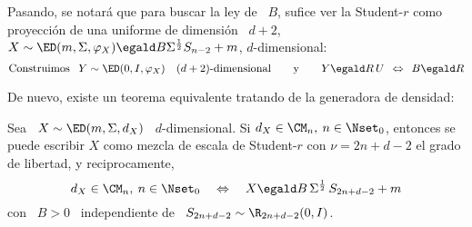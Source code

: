 Pasando, se notar\'a que para buscar la  ley de \ $B$, sufice ver la Student-$r$
como  proyecci\'on  de una  uniforme  de  dimensi\'on \  $d+2$,  \ie  \ $X  \sim
\ED(m,\Sigma,\varphi_X) \egald B \Sigma^{\frac12} S_{n-2} + m$, $d$-dimensional:
%
\[
\mbox{Construimos     }     \:\:     Y     \sim     \ED(0,I,\varphi_X)     \quad
(d+2)\mbox{-dimensional}  \qquad   \mbox{y}  \qquad  Y   \egald  R  \,   U  \:\:
\Leftrightarrow \:\: B \egald R
\]


De nuevo, existe un teorema equivalente tratando de la generadora de densidad:
%
\begin{teorema}
\label{Teo:MP:MezclaStudentRDensidad}
%
  Sea \  $X \sim \ED(m,\Sigma,d_X)$ \  $d$-dimensional. Si $d_X \in  \CM_n, \: n
  \in  \Nset_0$,  entonces  se puede  escribir  $X$  como  mezcla de  escala  de
  Student-$r$ con $\nu = 2 n + d - 2$ el grado de libertad, y reciprocamente,
  \[
  d_X \in  \CM_n, \:  n \in \Nset_0  \quad \Leftrightarrow  \quad X \egald  B \,
  \Sigma^{\frac12} \, S_{2 n + d - 2} + m
  \]
  con \ $B > 0$ \ independiente de \ $S_{2 n + d - 2} \sim \R_{2 n + d - 2}(0,I)$.
\end{teorema}
%

